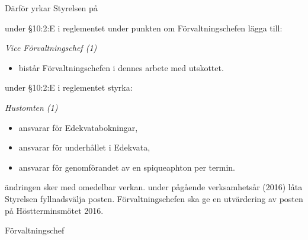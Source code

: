 \documentclass[../main/handlingar.tex]{subfiles}
\begin{document}

Därför yrkar Styrelsen på
\begin{attsatser}
    \att under \S10:2:E i reglementet under punkten om Förvaltningschefen lägga till:\par
    {\it
    Vice Förvaltningschef (1)
    \begin{itemize}[label={--}, topsep=0cm, noitemsep]
        \item bistår Förvaltningschefen i dennes arbete med utskottet.
    \end{itemize}
    }
    \att under \S10:2:E i reglementet styrka:\par
    {\it
    Hustomten (1)
    \begin{itemize}[label={--}, topsep=0cm, noitemsep]
        \item ansvarar för Edekvatabokningar,
        \item ansvarar för underhållet i Edekvata,
        \item ansvarar för genomförandet av en spiqueaphton per termin.
    \end{itemize}
    }
    \att ändringen sker med omedelbar verkan.
    \att under pågående verksamhetsår (2016) låta Styrelsen fyllnadsvälja posten.
    \att Förvaltningschefen ska ge en utvärdering av posten på Höstterminsmötet 2016.
\end{attsatser}

\begin{signatures}{1}
    \ist
    \signature{Anders Nilsson}{Förvaltningschef}
\end{signatures}
\end{document}
